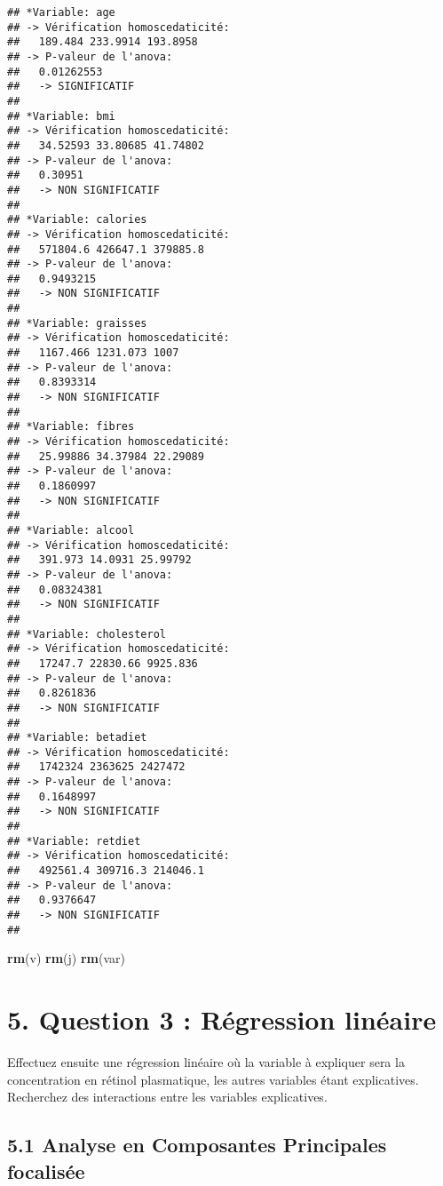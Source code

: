 \documentclass[]{article}
\newenvironment{Shaded}{\begin{snugshade}}{\end{snugshade}}
\newcommand{\KeywordTok}[1]{\textcolor[rgb]{0.13,0.29,0.53}{\textbf{#1}}}
\newcommand{\NormalTok}[1]{#1}
\begin{document}
\begin{verbatim}
## *Variable: age 
## -> Vérification homoscedaticité: 
##   189.484 233.9914 193.8958 
## -> P-valeur de l'anova: 
##   0.01262553 
##   -> SIGNIFICATIF 
##  
## *Variable: bmi 
## -> Vérification homoscedaticité: 
##   34.52593 33.80685 41.74802 
## -> P-valeur de l'anova: 
##   0.30951 
##   -> NON SIGNIFICATIF 
##  
## *Variable: calories 
## -> Vérification homoscedaticité: 
##   571804.6 426647.1 379885.8 
## -> P-valeur de l'anova: 
##   0.9493215 
##   -> NON SIGNIFICATIF 
##  
## *Variable: graisses 
## -> Vérification homoscedaticité: 
##   1167.466 1231.073 1007 
## -> P-valeur de l'anova: 
##   0.8393314 
##   -> NON SIGNIFICATIF 
##  
## *Variable: fibres 
## -> Vérification homoscedaticité: 
##   25.99886 34.37984 22.29089 
## -> P-valeur de l'anova: 
##   0.1860997 
##   -> NON SIGNIFICATIF 
##  
## *Variable: alcool 
## -> Vérification homoscedaticité: 
##   391.973 14.0931 25.99792 
## -> P-valeur de l'anova: 
##   0.08324381 
##   -> NON SIGNIFICATIF 
##  
## *Variable: cholesterol 
## -> Vérification homoscedaticité: 
##   17247.7 22830.66 9925.836 
## -> P-valeur de l'anova: 
##   0.8261836 
##   -> NON SIGNIFICATIF 
##  
## *Variable: betadiet 
## -> Vérification homoscedaticité: 
##   1742324 2363625 2427472 
## -> P-valeur de l'anova: 
##   0.1648997 
##   -> NON SIGNIFICATIF 
##  
## *Variable: retdiet 
## -> Vérification homoscedaticité: 
##   492561.4 309716.3 214046.1 
## -> P-valeur de l'anova: 
##   0.9376647 
##   -> NON SIGNIFICATIF 
## 
\end{verbatim}

\begin{Shaded}
\begin{Highlighting}[]
\KeywordTok{rm}\NormalTok{(v)}
\KeywordTok{rm}\NormalTok{(j)}
\KeywordTok{rm}\NormalTok{(var)}
\end{Highlighting}
\end{Shaded}

\section{5. Question 3 : Régression
linéaire}\label{question-3-ruxe9gression-linuxe9aire}

Effectuez ensuite une régression linéaire où la variable à expliquer
sera la concentration en rétinol plasmatique, les autres variables étant
explicatives. Recherchez des interactions entre les variables
explicatives.

\subsection{5.1 Analyse en Composantes Principales
focalisée}\label{analyse-en-composantes-principales-focalisuxe9e}
\end{document}
